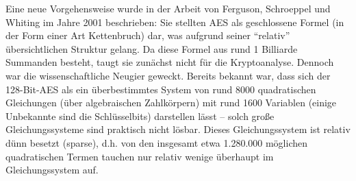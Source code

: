Eine neue Vorgehensweise wurde in der Arbeit von Ferguson, Schroeppel
und Whiting im Jahre 2001 \cite{Ferguson2001} beschrieben: Sie stellten
AES als geschlossene Formel (in der Form einer Art Kettenbruch) dar,
was aufgrund seiner "`relativ"' übersichtlichen Struktur gelang. Da
diese Formel aus rund 1 Billiarde Summanden besteht, taugt sie zunächst
nicht für die Kryptoanalyse. Dennoch war die wissenschaftliche Neugier
geweckt. Bereits bekannt war, dass sich der 128-Bit-AES als ein
überbestimmtes System von rund 8000 quadratischen Gleichungen
(über algebraischen Zahlkörpern) mit rund 1600 Variablen (einige
Unbekannte sind die Schlüsselbits) darstellen lässt -- solch große
Gleichungssysteme sind praktisch nicht lösbar. Dieses Gleichungssystem
ist relativ dünn besetzt (\glqq sparse\grqq), d.h. von den insgesamt etwa
1.280.000 möglichen quadratischen Termen tauchen nur relativ wenige
überhaupt im Gleichungssystem auf.


